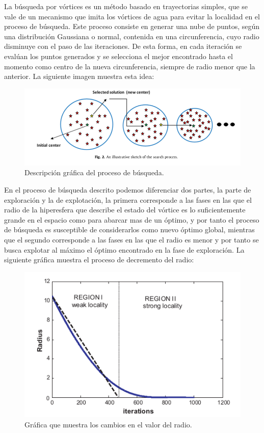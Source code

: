 \documentclass[11pt,a4paper]{article}
\begin{document}
	\noindent La búsqueda por vórtices es un método basado en trayectorias simples, que se vale de un mecanismo que imita los vórtices de agua para evitar la localidad en el proceso de búsqueda. Este proceso consiste en generar una nube de puntos, según una distribución Gaussiana o normal, contenida en una circunferencia, cuyo radio disminuye con el paso de las iteraciones. De esta forma, en cada iteración se evalúan los puntos generados y se selecciona el mejor encontrado hasta el momento como centro de la nueva circunferencia, siempre de radio menor que la anterior. La siguiente imagen muestra esta idea:
	
	\begin{figure}[!h]
		\centering
		\includegraphics[scale=0.45]{Imagenes/Imagen1.png} 
		\caption{Descripción gráfica del proceso de búsqueda.} \label{fig:figura2}
	\end{figure} 
	
	\noindent En el proceso de búsqueda descrito podemos diferenciar dos partes, la parte de exploración y la de explotación, la primera corresponde a las fases en las que el radio de la hiperesfera que describe el estado del vórtice es lo suficientemente grande en el espacio como para abarcar mas de un óptimo, y por tanto el proceso de búsqueda es susceptible de considerarlos como nuevo óptimo global, mientras que el segundo corresponde a las fases en las que el radio es menor y por tanto se busca explotar al máximo el óptimo encontrado en la fase de exploración. La siguiente gráfica muestra el proceso de decremento del radio: 
	
	\begin{figure}[!h]
		\centering
		\includegraphics[scale=0.55]{Imagenes/Imagen2.png} 
		\caption{Gráfica que muestra los cambios en el valor del radio.} \label{fig:figura2}
	\end{figure}
	
\end{document}
